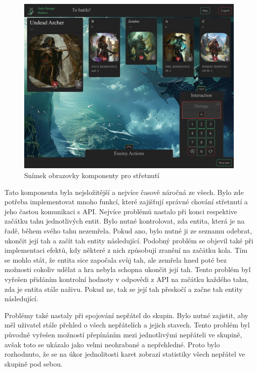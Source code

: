\begin{figure}[H]
  \centering
  \includegraphics[width=.95\textwidth]{resources/figures/TTS-Encounter.png}
  \caption{Snímek obrazovky komponenty pro střetnutí}
  \label{fig:combat}
\end{figure}

Tato komponenta byla nejsložitější a nejvíce časově náročná ze všech. Bylo zde potřeba implementovat mnoho funkcí, které zajišťují správné chování střetnutí a jeho častou komunikaci s API. Nejvíce problémů nastalo při konci respektive začátku tahu jednotlivých entit. Bylo nutné kontrolovat, zda entita, která je na řadě, během svého tahu nezemřela. Pokud ano, bylo nutné ji ze seznamu odebrat, ukončit její tah a začít tah entity následující. Podobný problém se objevil také při implementaci efektů, kdy některé z nich způsobují zranění na začátku kola. Tím se mohlo stát, že entita sice započala svůj tah, ale zemřela hned poté bez možnosti cokoliv udělat a hra nebyla schopna ukončit její tah. Tento problém byl vyřešen přidáním kontrolní hodnoty v odpovědi z API na začátku každého tahu, zda je entita stále naživu. Pokud ne, tak se její tah přeskočí a začne tah entity následující.

Problémy také nastaly při spojování nepřátel do skupin. Bylo nutné zajistit, aby měl uživatel stále přehled o všech nepřátelích a jejich stavech. Tento problém byl původně vyřešen možností přepínáním mezi jednotlivými nepřáteli ve skupině, avšak toto se ukázalo jako velmi neohrabané a nepřehledné. Proto bylo rozhodnuto, že se na úkor jednolitosti karet zobrazí statistiky všech nepřátel ve skupině pod sebou.

